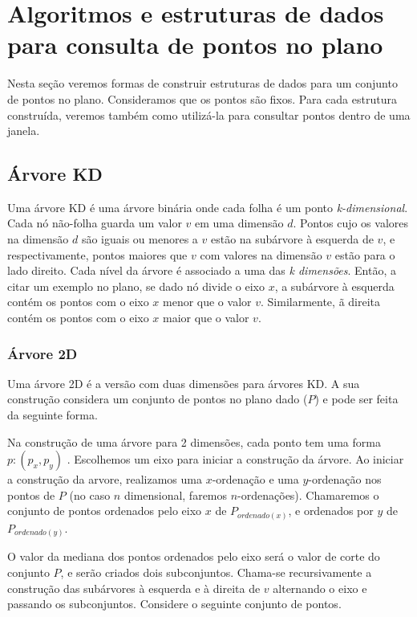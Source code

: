 \chapter{Algoritmos e estruturas de dados para consulta de pontos no plano}\label{cap:desenvolvimento}
Nesta seção veremos formas de construir estruturas de dados para um conjunto de pontos no plano. 
Consideramos que os pontos são fixos. Para cada estrutura construída, veremos também como utilizá-la para
consultar pontos dentro de uma janela.

\section{Árvore KD}

Uma árvore KD é uma árvore binária onde cada folha é um ponto \textit{k-dimensional}.
Cada nó não-folha guarda um valor $v$ em uma dimensão $d$.
Pontos cujo os valores na dimensão $d$ são iguais ou menores a $v$ estão na subárvore à esquerda de $v$,
e respectivamente, pontos maiores que $v$ com valores na dimensão $v$ estão para o lado direito.
Cada nível da árvore é associado a uma das \textit{k dimensões}. Então, a citar um exemplo no plano, se dado nó
 divide o eixo
$x$, a subárvore à esquerda contém os pontos com o eixo $x$ menor que o valor $v$. Similarmente,
 ã direita contém os pontos com o eixo $x$ maior que o valor $v$. 

\subsection{Árvore 2D}
Uma árvore 2D é a versão com duas dimensões para árvores KD. A sua construção considera um conjunto 
de pontos no plano dado ($P$) e pode ser feita da seguinte forma.

Na construção de uma árvore para 2 dimensões, cada ponto tem uma forma $p : (p_x, p_y)$ .
Escolhemos um eixo para iniciar a construção da árvore. Ao iniciar a construção da arvore,
realizamos uma $x$-ordenação e uma $y$-ordenação nos pontos de $P$ (no caso $n$ dimensional, faremos
$n$-ordenações). Chamaremos o conjunto de pontos ordenados pelo eixo $x$ de $P_{ordenado(x)}$, e ordenados por $y$ de 
$P_{ordenado(y)}$.

O \cite{cg08} valor da mediana dos pontos ordenados pelo eixo será o valor de corte do conjunto $P$,
e serão criados dois subconjuntos.
Chama-se recursivamente a construção das subárvores à esquerda e à direita de $v$ alternando o eixo 
e passando os subconjuntos. Considere o seguinte conjunto de pontos.

